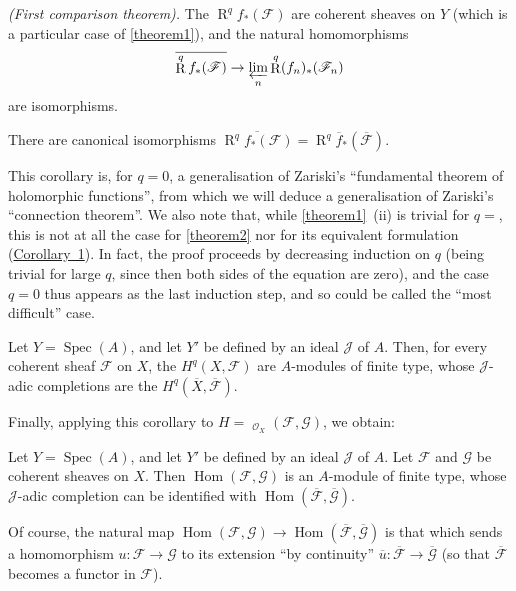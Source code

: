 \documentclass{article}
\theoremstyle{plain}
\newenvironment{theorem}[1]
  {\renewcommand\theinnercustomtheorem{#1}\innercustomtheorem}
  {\endinnercustomtheorem}
\newenvironment{corollary}[1]
  {\renewcommand\theinnercustomcorollary{#1}\innercustomcorollary}
  {\endinnercustomcorollary}
\theoremstyle{definition}
\newcommand{\sh}[1]{{\mathscr{#1}}}
\DeclareMathOperator{\Spec}{Spec}
\DeclareMathOperator{\RR}{R}
\DeclareMathOperator{\Hom}{Hom}
\DeclareMathOperator{\shHom}{\underline{\Hom}}
\begin{document}
\begin{theorem}{2}
\label{theorem2}
  \emph{(First comparison theorem).}
  The $\RR^q f_*(\sh{F})$ are coherent sheaves on $Y$ (which is a particular case of \cref{theorem1}), and the natural homomorphisms
  \[
    \overline{\RR^q f_*(\sh{F})} \to \varprojlim_n \RR^q (f_n)_*(\sh{F}_n)
  \]
  are isomorphisms.
\end{theorem}

\begin{corollary}{1}
\label{theorem2corollary1}
  There are canonical isomorphisms $\overline{\RR^q f_*(\sh{F})} = \RR^q\overline{f}_*(\overline{\sh{F}})$.
\end{corollary}

This corollary is, for $q=0$, a generalisation of Zariski's ``fundamental theorem of holomorphic functions'', from which we will deduce a generalisation of Zariski's ``connection theorem''.
We also note that, while \cref{theorem1}~(ii) is trivial for $q=$, this is not at all the case for \cref{theorem2} nor for its equivalent formulation (\hyperref[theorem2corollary1]{Corollary~1}).
In fact, the proof proceeds by decreasing induction on $q$ (being trivial for large $q$, since then both sides of the equation are zero), and the case $q=0$ thus appears as the last induction step, and so could be called the ``most difficult'' case.

\begin{corollary}{2}
\label{theorem2corollary2}
  Let $Y=\Spec(A)$, and let $Y'$ be defined by an ideal $\sh{J}$ of $A$.
  Then, for every coherent sheaf $\sh{F}$ on $X$, the $H^q(X,\sh{F})$ are $A$-modules of finite type, whose $\sh{J}$-adic completions are the $H^q(\overline{X},\overline{\sh{F}})$.
\end{corollary}

Finally, applying this corollary to $H=\shHom_{\sh{O}_X}(\sh{F},\sh{G})$, we obtain:

\begin{corollary}{3}
\label{theorem2corollary3}
  Let $Y=\Spec(A)$, and let $Y'$ be defined by an ideal $\sh{J}$ of $A$.
  Let $\sh{F}$ and $\sh{G}$ be coherent sheaves on $X$.
  Then $\Hom(\sh{F},\sh{G})$ is an $A$-module of finite type, whose $\sh{J}$-adic completion can be identified with $\Hom(\overline{\sh{F}},\overline{\sh{G}})$.
\end{corollary}

Of course, the natural map $\Hom(\sh{F},\sh{G})\to\Hom(\overline{\sh{F}},\overline{\sh{G}})$ is that which sends a homomorphism $u\colon\sh{F}\to\sh{G}$ to its extension ``by continuity'' $\overline{u}\colon\overline{\sh{F}}\to\overline{\sh{G}}$ (so that $\overline{\sh{F}}$ becomes a functor in $\sh{F}$).
\end{document}
